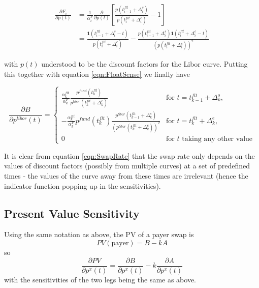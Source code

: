 \begin{equation}
\label{eqn:ForwardRateSense}
\begin{split}
\frac{\partial F_i}{\partial p(t)} &= \frac{1}{\alpha^{F}_i }\frac{\partial}{\partial p(t)} \left[ \frac{p(t^{flt}_{i-1}+\Delta^s_i)} {p(t^{flt}_i+\Delta^e_i)} -1\right]\\
&=\frac{\mathbf{1}(t^{flt}_{i-1}+\Delta^s_i-t)} {p(t^{flt}_i+\Delta^e_i)} - \frac{p(t^{flt}_{i-1}+\Delta^s_i)\mathbf{1}(t^{flt}_{i}+\Delta^e_i-t)} {\left(p(t^{flt}_i+\Delta^e_i)\right)^2}
\end{split}
\end{equation}

with $p(t)$ understood to be the discount factors for the Libor curve.  Putting this together with equation \ref{eqn:FloatSense} we finally have 

\begin{equation}
\label{eqn:FloatLegSense}
\frac{\partial B}{\partial p^{libor}(t)}=
\begin{cases}
 \frac{\alpha^{flt}_k}{\alpha^{F}_k }\frac{p^{fund}(t^{flt}_{k})} {p^{libor}(t^{flt}_k+\Delta^e_k)}& \text{for } t=t^{flt}_{k-1}+\Delta^s_k,\\
 -\frac{\alpha^{flt}_k}{\alpha^{F}_k }p^{fund}(t^{flt}_{k})\frac{p^{libor}(t^{flt}_{k-1}+\Delta^s_k)} {\left(p^{libor}(t^{flt}_k+\Delta^e_k)\right)^2}& \text{for } t=t^{flt}_{k}+\Delta^e_k,\\
 0 & \text{for $t$ taking any other value}
 \end{cases}
\end{equation}

It is clear from equation  \ref{eqn:SwapRate} that the swap rate only depends on the values of discount factors (possibly from multiple curves) at a set of predefined times - the values of the curve away from these times are irrelevant (hence the indicator function popping up in the sensitivities). 

\subsection{Present Value Sensitivity}
Using the same notation as above, the PV of a payer swap is
%
\begin{equation}
PV(\text{payer}) = B-kA
\end{equation}
%
so
%
\begin{equation}
\frac{\partial PV}{\partial p^{x}(t)}= \frac{\partial B}{\partial p^{x}(t)}-k\frac{\partial A}{\partial p^{x}(t)}
\end{equation}
with the sensitivities of the two legs being the same as above. 



